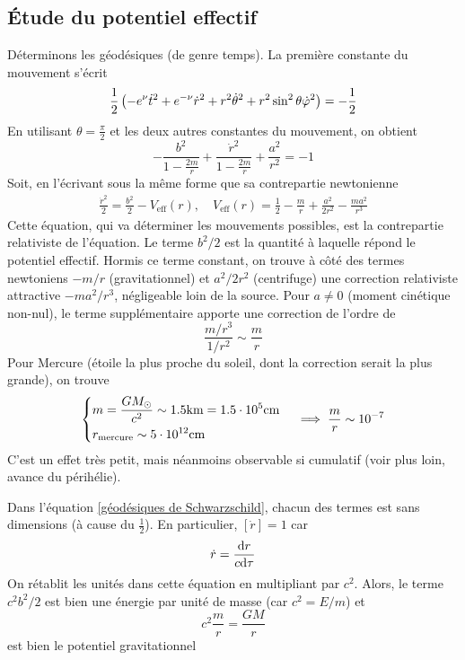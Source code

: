 \subsection{Étude du potentiel effectif}
Déterminons les géodésiques (de genre temps). La première constante du mouvement s'écrit 
\begin{equation}
    \frac{1}{2} \left( - e^\nu \dot{t}^2 + e^{-\nu} \dot{r}^2 + r^2 \dot{\theta}^2 +r^2 \sin^2 \theta \dot{\varphi}^2\right) = - \frac{1}{2}
\end{equation}
En utilisant $\theta = \frac{\pi}{2}$ et les deux autres constantes du mouvement, on obtient
\begin{equation}
    - \frac{b^2}{1 - \frac{2m}{r}} + \frac{\dot{r}^2}{1 - \frac{2m}{r}} + \frac{a^2}{r^2} = -1
\end{equation}
Soit, en l'écrivant sous la même forme que sa contrepartie newtonienne
\begin{align}
    \label{géodésiques de Schwarzschild}
    \boxed{\frac{\dot{r}^2}{2} = \frac{b^2}{2} - V_\text{eff} (r), \quad V_\text{eff} (r) = \frac{1}{2} - \frac{m}{r} + \frac{a^2}{2r^2} - \frac{ma^2}{r^3}}
\end{align}
Cette équation, qui va déterminer les mouvements possibles, est la contrepartie relativiste de l'équation. Le terme $b^2/2$ est la quantité à laquelle répond le potentiel effectif. Hormis ce terme constant, on trouve à côté des termes newtoniens $-m/r$ (gravitationnel) et $a^2/2r^2$ (centrifuge) une correction relativiste attractive $-ma^2/r^3$, négligeable loin de la source. Pour $a \neq 0$ (moment cinétique non-nul), le terme supplémentaire apporte une correction de l'ordre de
\begin{equation}
    \frac{m/r^3}{1/r^2} \sim \frac{m}{r}
\end{equation}
Pour Mercure (étoile la plus proche du soleil, dont la correction serait la plus grande), on trouve
\begin{equation}
    \begin{dcases}
        m = \frac{GM_\odot}{c^2} \sim 1.5\text{km} = 1.5 \cdot 10^5\text{cm} \\
        r_\text{mercure}\sim 5 \cdot 10^{12}\text{cm} \\
    \end{dcases}
    \quad\implies \frac{m}{r} \sim 10^{-7}
\end{equation}
C'est un effet très petit, mais néanmoins observable si cumulatif (voir plus loin, avance du périhélie).
\begin{rmk}
    Dans l'équation \ref{géodésiques de Schwarzschild}, chacun des termes est sans dimensions (à cause du $\frac{1}{2}$). En particulier, $[\dot{r}] = 1$ car
    \begin{equation*}
        \dot{r} = \frac{\mathrm{d} r}{c \mathrm{d} \tau}
    \end{equation*}
    On rétablit les unités dans cette équation en multipliant par $c^2$. Alors, le terme $c^2b^2/2$ est bien une énergie par unité de masse (car $c^2 = E/m$) et
    \begin{equation*}
        c^2 \frac{m}{r} = \frac{GM}{r}
    \end{equation*}
    est bien le potentiel gravitationnel
\end{rmk}
